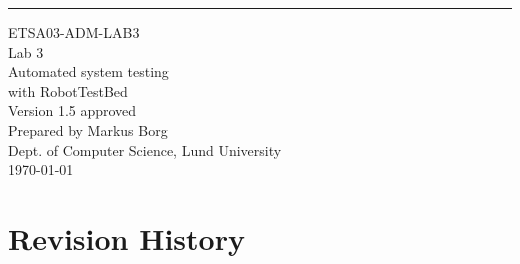 \documentclass{scrreprt}
\date{}
\def\myversion{1.5 }
\begin{document}
\begin{flushright}
    \rule{16cm}{5pt}\vskip1cm
    \begin{bfseries}
    	\LARGE{ETSA03-ADM-LAB3}\\
    	\vspace{1.5cm}
        \Huge{Lab 3}\\
        \vspace{0.5cm}
        Automated system testing\\
        \vspace{0.5cm}
        with RobotTestBed\\
        \vspace{1.5cm}
        \LARGE{Version \myversion approved}\\
        \vspace{1.5cm}
        Prepared by Markus Borg\\
        Dept. of Computer Science, Lund University\\
        \vspace{1.5cm}
        \today\\
    \end{bfseries}
\end{flushright}


\chapter*{Revision History}
\end{document}
